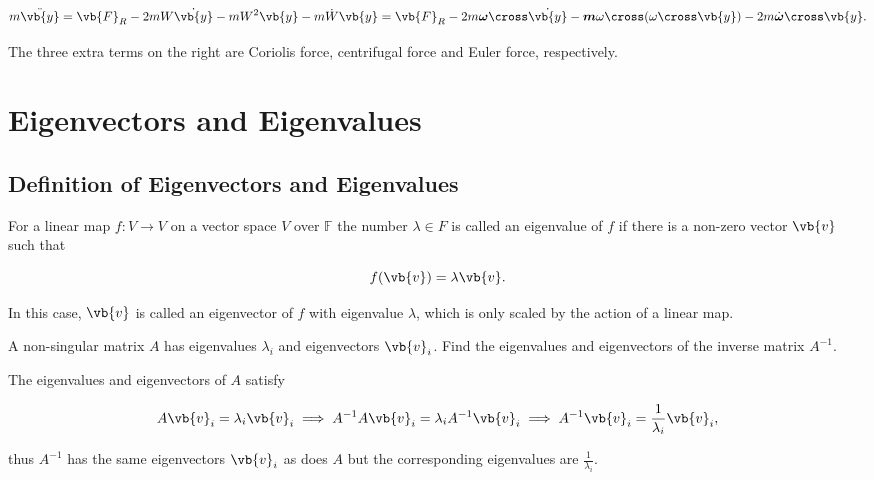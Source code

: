 \documentclass[a4paper,12pt]{report}
\begin{document}
\begin{equation}
    m \ddot{\vb{y} }  = \vb{F} _{R} - 2mW \dot{\vb{y} } - mW^2 \vb{y}  - m \dot{W} \vb{y} = \vb{F} _{R} - 2m \boldsymbol{\omega }\cross \dot{\vb{y} } - \boldsymbol{m} \omega \cross (\omega \cross \vb{y} ) - 2m \dot{\boldsymbol{\omega } }\cross \vb{y} .       
\end{equation}

The three extra terms on the right are Coriolis force, centrifugal force and Euler force, respectively.

\chapter{Eigenvectors and Eigenvalues}

\section{Definition of Eigenvectors and Eigenvalues}



\begin{definition}
For a linear map \(f:V \rightarrow V\) on a vector space \(V\) over \(\mathbb{F}\) the number \(\lambda \in F\) is called an eigenvalue of \(f\) if there is a non-zero vector \(\vb{v} \) such that 

\begin{equation}
    f(\vb{v} ) = \lambda \vb{v} .
\end{equation}

In this case, \(\vb{v} \) is called an eigenvector of \(f\) with eigenvalue \(\lambda \), which is only scaled by the action of a linear map.

\end{definition}

{A non-singular matrix \(A\) has eigenvalues \(\lambda _{i} \) and eigenvectors \(\vb{v} _{i} \). Find the eigenvalues and eigenvectors of the inverse matrix \(A^{-1} \).   }
{The eigenvalues and eigenvectors of \(A\) satisfy

\begin{equation}
    A \vb{v} _{i} = \lambda _{i}\vb{v} _{i} \implies A^{-1} A \vb{v} _{i} = \lambda _{i}A^{-1} \vb{v} _{i} \implies A^{-1} \vb{v} _{i} = \frac{1}{\lambda _{i} }\vb{v} _{i},    
\end{equation}

thus \(A^{-1} \) has the same eigenvectors \(\vb{v} _{i} \) as does \(A\) but the corresponding eigenvalues are \(\frac{1}{\lambda _{i} } \).   
} 
\end{document}
